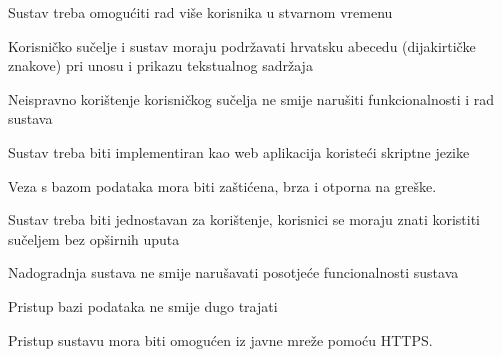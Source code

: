%		 
%			 

		\begin{packed_item}
		
			\item Sustav treba omogućiti rad više korisnika u stvarnom vremenu
			\item 	Korisničko sučelje i sustav moraju podržavati hrvatsku abecedu (dijakirtičke znakove) pri unosu i prikazu tekstualnog sadržaja
			\item Neispravno korištenje korisničkog sučelja ne smije narušiti funkcionalnosti i rad sustava
			\item Sustav treba biti implementiran kao web aplikacija koristeći skriptne jezike
			\item Veza s bazom podataka mora biti zaštićena, brza i otporna na greške.
			\item Sustav treba biti jednostavan za korištenje, korisnici se moraju znati koristiti sučeljem bez opširnih uputa
			\item Nadogradnja sustava ne smije narušavati posotjeće funcionalnosti sustava
			\item Pristup bazi podataka ne smije dugo trajati
			\item Pristup sustavu mora biti omogućen iz javne mreže pomoću HTTPS.
		
		\end{packed_item}
			 
			 
	
